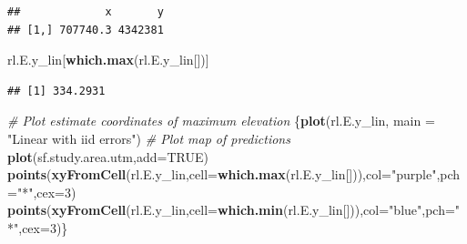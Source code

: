 \documentclass[
]{book}
\newenvironment{Shaded}{\begin{snugshade}}{\end{snugshade}}
\newcommand{\AttributeTok}[1]{\textcolor[rgb]{0.13,0.29,0.53}{#1}}
\newcommand{\CommentTok}[1]{\textcolor[rgb]{0.56,0.35,0.01}{\textit{#1}}}
\newcommand{\ConstantTok}[1]{\textcolor[rgb]{0.56,0.35,0.01}{#1}}
\newcommand{\DecValTok}[1]{\textcolor[rgb]{0.00,0.00,0.81}{#1}}
\newcommand{\FunctionTok}[1]{\textcolor[rgb]{0.13,0.29,0.53}{\textbf{#1}}}
\newcommand{\NormalTok}[1]{#1}
\newcommand{\OtherTok}[1]{\textcolor[rgb]{0.56,0.35,0.01}{#1}}
\newcommand{\SpecialCharTok}[1]{\textcolor[rgb]{0.81,0.36,0.00}{\textbf{#1}}}
\newcommand{\StringTok}[1]{\textcolor[rgb]{0.31,0.60,0.02}{#1}}
\begin{document}
\begin{Shaded}
\end{Shaded}

\begin{verbatim}
##             x       y
## [1,] 707740.3 4342381
\end{verbatim}

\begin{Shaded}
\begin{Highlighting}[]
\NormalTok{rl.E.y\_lin[}\FunctionTok{which.max}\NormalTok{(rl.E.y\_lin[])]}
\end{Highlighting}
\end{Shaded}

\begin{verbatim}
## [1] 334.2931
\end{verbatim}

\begin{Shaded}
\begin{Highlighting}[]
\CommentTok{\# Plot estimate coordinates of maximum elevation}
\NormalTok{\{}\FunctionTok{plot}\NormalTok{(rl.E.y\_lin, }\AttributeTok{main =} \StringTok{"Linear with iid errors"}\NormalTok{) }\CommentTok{\# Plot map of predictions}
\FunctionTok{plot}\NormalTok{(sf.study.area.utm,}\AttributeTok{add=}\ConstantTok{TRUE}\NormalTok{)}
\FunctionTok{points}\NormalTok{(}\FunctionTok{xyFromCell}\NormalTok{(rl.E.y\_lin,}\AttributeTok{cell=}\FunctionTok{which.max}\NormalTok{(rl.E.y\_lin[])),}\AttributeTok{col=}\StringTok{"purple"}\NormalTok{,}\AttributeTok{pch=}\StringTok{"*"}\NormalTok{,}\AttributeTok{cex=}\DecValTok{3}\NormalTok{)}
\FunctionTok{points}\NormalTok{(}\FunctionTok{xyFromCell}\NormalTok{(rl.E.y\_lin,}\AttributeTok{cell=}\FunctionTok{which.min}\NormalTok{(rl.E.y\_lin[])),}\AttributeTok{col=}\StringTok{"blue"}\NormalTok{,}\AttributeTok{pch=}\StringTok{"*"}\NormalTok{,}\AttributeTok{cex=}\DecValTok{3}\NormalTok{)\}}
\end{Highlighting}
\end{Shaded}
\end{document}
